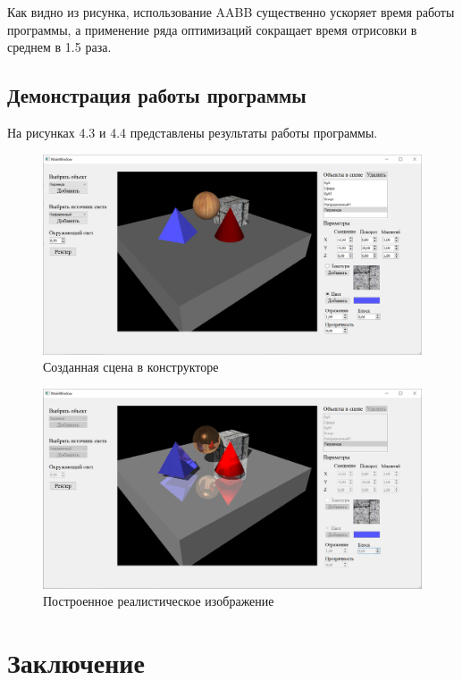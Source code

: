 \documentclass[12pt,a4paper,oneside]{report}
\begin{document}
	 Как видно из рисунка, использование AABB существенно ускоряет время работы программы, а применение ряда оптимизаций сокращает время отрисовки в среднем в 1.5 раза.
	
	\section{Демонстрация работы программы}
	 \quad На рисунках 4.3 и 4.4 представлены результаты работы программы.
	
	\begin{figure}[H]
		\centering
		\includegraphics[scale = 0.5]{constructor}
		\caption{Созданная сцена в конструкторе}
	\end{figure}


	\begin{figure}[H]
		\centering
		\includegraphics[scale = 0.5]{final}
		\caption{Построенное реалистическое изображение}
	\end{figure}
	

	\chapter*{Заключение}
	
\end{document}
